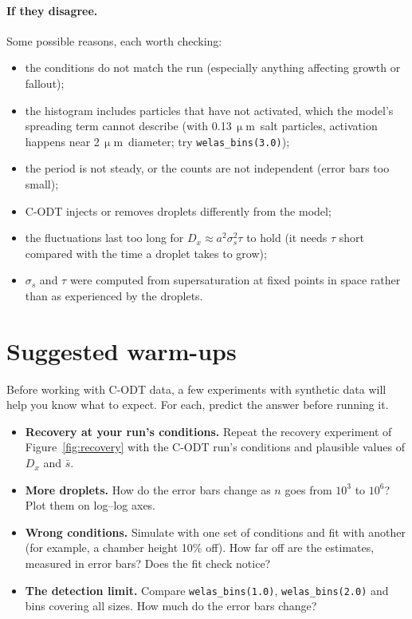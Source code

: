 \documentclass[11pt]{article}
\newcommand{\um}{\ensuremath{\,\upmu\mathrm{m}}\xspace}
\newcommand{\sbar}{\bar s}
\newcommand{\Dx}{D_x}
\newcommand{\code}[1]{\texttt{#1}}
\begin{document}
\paragraph{If they disagree.} Some possible reasons, each worth checking:
\begin{itemize}
\item the conditions do not match the run (especially anything affecting growth or fallout);
\item the histogram includes particles that have not activated, which the model's spreading term cannot
describe (with 0.13\um\ salt particles, activation happens near 2\um\ diameter; try \code{welas\_bins(3.0)});
\item the period is not steady, or the counts are not independent (error bars too small);
\item C-ODT injects or removes droplets differently from the model;
\item the fluctuations last too long for $\Dx \approx a^2\sigma_s^2\tau$ to hold (it needs $\tau$ short
compared with the time a droplet takes to grow);
\item $\sigma_s$ and $\tau$ were computed from supersaturation at fixed points in space rather than as
experienced by the droplets.
\end{itemize}

\section{Suggested warm-ups}\label{sec:warmups}

Before working with C-ODT data, a few experiments with synthetic data will help you know what to expect.
For each, predict the answer before running it.
\begin{itemize}
\item \textbf{Recovery at your run's conditions.} Repeat the recovery experiment of
Figure~\ref{fig:recovery} with the C-ODT run's conditions and plausible values of $\Dx$ and $\sbar$.
\item \textbf{More droplets.} How do the error bars change as $n$ goes from $10^3$ to $10^6$? Plot them on
log--log axes.
\item \textbf{Wrong conditions.} Simulate with one set of conditions and fit with another (for example, a
chamber height 10\% off). How far off are the estimates, measured in error bars? Does the fit check notice?
\item \textbf{The detection limit.} Compare \code{welas\_bins(1.0)}, \code{welas\_bins(2.0)} and bins
covering all sizes. How much do the error bars change?
\end{itemize}
\end{document}
